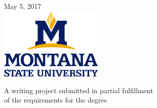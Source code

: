 \documentclass[12pt]{article}\usepackage[]{graphicx}\usepackage[]{color}
\begin{document}
\begin{titlepage}
{\large May 5, 2017}\\[2cm] %


\includegraphics[width=5cm]{MSU-vert.png} %
 

A writing project submitted in partial fulfillment\\
of the requirements for the degree\\[.25in]

\vfill %

\end{titlepage}
\end{document}
